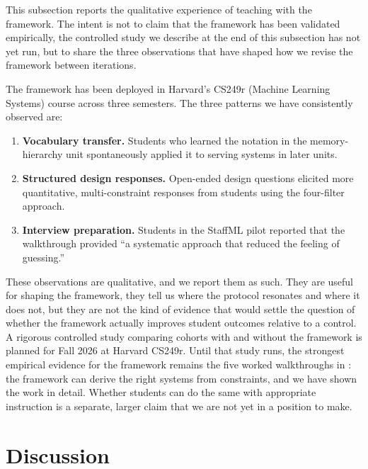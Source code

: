 \documentclass[10pt,twocolumn]{article}
\begin{document}
This subsection reports the qualitative experience of teaching with the framework. The intent is not to claim that the framework has been validated empirically, the controlled study we describe at the end of this subsection has not yet run, but to share the three observations that have shaped how we revise the framework between iterations.

The framework has been deployed in Harvard's CS249r (Machine Learning Systems) course across three semesters. The three patterns we have consistently observed are:

\begin{enumerate}[nosep, leftmargin=*]
\item \textbf{Vocabulary transfer.} Students who learned the notation in the memory-hierarchy unit spontaneously applied it to serving systems in later units.

\item \textbf{Structured design responses.} Open-ended design questions elicited more quantitative, multi-constraint responses from students using the four-filter approach.

\item \textbf{Interview preparation.} Students in the StaffML pilot reported that the walkthrough provided ``a systematic approach that reduced the feeling of guessing.''
\end{enumerate}

These observations are qualitative, and we report them as such. They are useful for shaping the framework, they tell us where the protocol resonates and where it does not, but they are not the kind of evidence that would settle the question of whether the framework actually improves student outcomes relative to a control. A rigorous controlled study comparing cohorts with and without the framework is planned for Fall 2026 at Harvard CS249r. Until that study runs, the strongest empirical evidence for the framework remains the five worked walkthroughs in : the framework can derive the right systems from constraints, and we have shown the work in detail. Whether students can do the same with appropriate instruction is a separate, larger claim that we are not yet in a position to make.

\section{Discussion}
\label{sec:conclusion}
\end{document}
